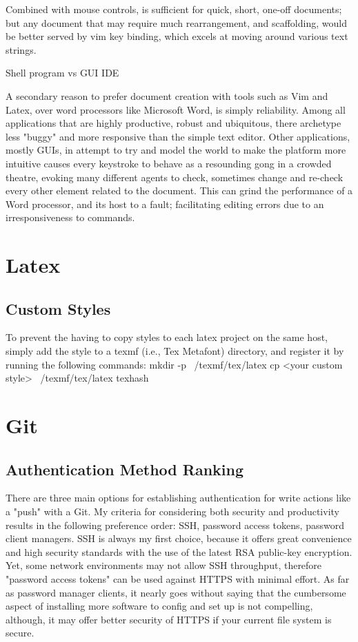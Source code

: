 \documentclass{article}
\begin{document}
Combined with mouse controls, is sufficient for quick, short, one-off documents; but any document that may require much rearrangement, and scaffolding, would be better served by vim key binding, which excels at moving around various text strings.

Shell program vs GUI IDE


A secondary reason to prefer document creation with tools such as Vim and Latex, over word processors like Microsoft Word, is simply reliability.  Among all applications that are highly productive, robust and ubiquitous, there archetype less "buggy" and more responsive than the simple text editor.  Other applications, mostly GUIs, in attempt to try and model the world to make the platform more intuitive causes every keystroke to behave as a resounding gong in a crowded theatre, evoking many different agents to check, sometimes change and re-check every other element related to the document.  This can grind the performance of a Word processor, and its host to a fault; facilitating editing errors due to an irresponsiveness to commands. 

\section{Latex}
\subsection{Custom Styles}
To prevent the having to copy styles to each latex project on the same host, simply add the style to a texmf (i.e., Tex Metafont) directory, and register it by running the following commands:
mkdir -p ~/texmf/tex/latex
cp <your custom style> ~/texmf/tex/latex
texhash


\section{Git}
\subsection{Authentication Method Ranking}
There are three main options for establishing authentication for write actions like a "push" with a Git.  My criteria for considering both security and productivity results in the following preference order: SSH, password access tokens, password client managers.  SSH is always my first choice, because it offers great convenience and high security standards with the use of the latest RSA public-key encryption.  Yet, some network environments may not allow SSH throughput, therefore "password access tokens" can be used against HTTPS with minimal effort.  As far as password manager clients, it nearly goes without saying that the cumbersome aspect of installing more software to config and set up is not compelling, although, it may offer better security of HTTPS if your current file system is secure.
\end{document}
